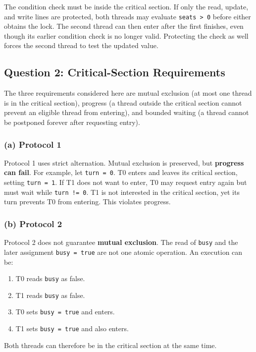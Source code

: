 \documentclass[conference]{IEEEtran}
\begin{document}
The condition check must be inside the critical section. If only the read, update, and write lines are protected, both threads may evaluate \texttt{seats > 0} before either obtains the lock. The second thread can then enter after the first finishes, even though its earlier condition check is no longer valid. Protecting the check as well forces the second thread to test the updated value.

\subsection{Question 2: Critical-Section Requirements}

The three requirements considered here are mutual exclusion (at most one thread is in the critical section), progress (a thread outside the critical section cannot prevent an eligible thread from entering), and bounded waiting (a thread cannot be postponed forever after requesting entry).

\subsubsection{(a) Protocol 1}
Protocol 1 uses strict alternation. Mutual exclusion is preserved, but \textbf{progress can fail}. For example, let \texttt{turn = 0}. T0 enters and leaves its critical section, setting \texttt{turn = 1}. If T1 does not want to enter, T0 may request entry again but must wait while \texttt{turn != 0}. T1 is not interested in the critical section, yet its turn prevents T0 from entering. This violates progress.

\subsubsection{(b) Protocol 2}
Protocol 2 does not guarantee \textbf{mutual exclusion}. The read of \texttt{busy} and the later assignment \texttt{busy = true} are not one atomic operation. An execution can be:

\begin{enumerate}
    \item T0 reads \texttt{busy} as false.
    \item T1 reads \texttt{busy} as false.
    \item T0 sets \texttt{busy = true} and enters.
    \item T1 sets \texttt{busy = true} and also enters.
\end{enumerate}

Both threads can therefore be in the critical section at the same time.
\end{document}
